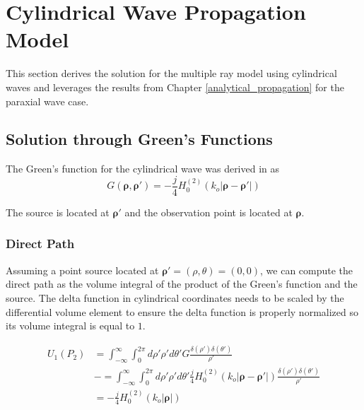 \chapter{Cylindrical Wave Propagation Model}
\label{cylindrical_propagation}
This section derives the solution for the multiple ray model using cylindrical waves and leverages the results from Chapter \ref{analytical_propagation} for the paraxial wave case.

\section{Solution through Green's Functions}
The Green's function for the cylindrical wave was derived in \cite{frazier_green} as
\begin{equation}
G\left(\boldsymbol{\rho},\boldsymbol{\rho}'\right) = -\frac{j}{4}H_0^{(2)}\left(k_o|\boldsymbol{\rho} - \boldsymbol{\rho}' | \right)
\label{cyl_eq:1}
\end{equation}
\renewcommand{\baselinestretch}{2} \small\normalsize

\noindent The source is located at $\boldsymbol{\rho}'$ and the observation point is located at $\boldsymbol{\rho}$. 

\subsection{Direct Path}
Assuming a point source located at $\boldsymbol{\rho}' = (\rho,\theta) = (0,0)$, we can compute the direct path as the volume integral of the product of the Green's function and the source. The delta function in cylindrical coordinates needs to be scaled by the differential volume element to ensure the delta function is properly normalized so its volume integral is equal to $1$.  

\begin{equation}
\begin{aligned}
U_1(P_2) & = \int_{-\infty}^{\infty}\int_0^{2\pi} d\rho' \rho' d\theta' G\frac{\delta(\rho')\delta(\theta')}{\rho'}\\
&-= \int_{-\infty}^{\infty}\int_0^{2\pi} d\rho' \rho' d\theta' \frac{j}{4}H_0^{(2)}\left(k_o|\boldsymbol{\rho} - \boldsymbol{\rho}' | \right)\frac{\delta(\rho')\delta(\theta')}{\rho'}\\
&=-\frac{j}{4}H_0^{(2)}\left(k_o|\boldsymbol{\rho}| \right)
\label{cyl_eq:2}
\end{aligned}
\end{equation}
\renewcommand{\baselinestretch}{2} \small\normalsize

